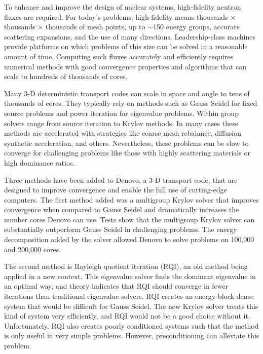 
\noindent       %
To enhance and improve the design of nuclear systems, high-fidelity neutron fluxes are required. For today's problems, high-fidelity means thousands $\times$ thousands $\times$ thousands of mesh points, up to $\sim$150 energy groups, accurate scattering expansions, and the use of many directions. Leadership-class machines provide platforms on which problems of this size can be solved in a reasonable amount of time. Computing such fluxes accurately and efficiently requires numerical methods with good convergence properties and algorithms that can scale to hundreds of thousands of cores. 

\vspace*{0.5em}
\noindent       %
Many 3-D deterministic transport codes can scale in space and angle to tens of thousands of cores. They typically rely on methods such as Gauss Seidel for fixed source problems and power iteration for eigenvalue problems. Within group solvers range from source iteration to Krylov methods. In many cases these methods are accelerated with strategies like coarse mesh rebalance, diffusion synthetic acceleration, and others. Nevertheless, these problems can be slow to converge for challenging problems like those with highly scattering materials or high dominance ratios. 

\vspace*{0.5em}
\noindent       %
Three methods have been added to Denovo, a 3-D \Sn transport code, that are designed to improve convergence and enable the full use of cutting-edge computers. The first method added was a multigroup Krylov solver that improves convergence when compared to Gauss Seidel and dramatically increases the number cores Denovo can use. Tests show that the multigroup Krylov solver can substantially outperform Gauss Seidel in challenging problems. The energy decomposition added by the solver allowed Denovo to solve problems on 100,000 and 200,000 cores. 

\vspace*{0.5em}
\noindent       %
The second method is Rayleigh quotient iteration (RQI), an old method being applied in a new context. This eigenvalue solver finds the dominant eigenvalue in an optimal way, and theory indicates that RQI should converge in fewer iterations than traditional eigenvalue solvers. RQI creates an energy-block dense system that would be difficult for Gauss Seidel. The new Krylov solver treats this kind of system very efficiently, and RQI would not be a good choice without it. Unfortunately, RQI also creates poorly conditioned systems such that the method is only useful in very simple problems. However, preconditioning can alleviate this problem. 

